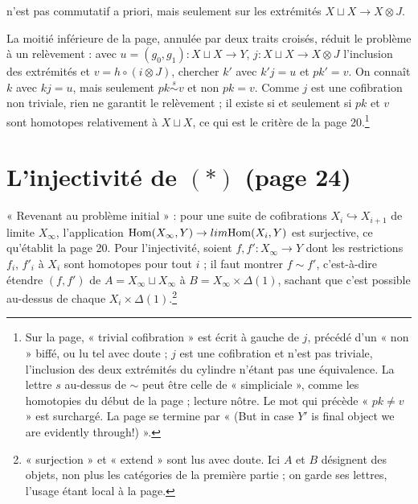 \documentclass[11pt,a4paper]{article}
\begin{document}

n'est pas commutatif a priori, mais seulement sur les extrémités $X \sqcup X
\to X \otimes J$.

La moitié inférieure de la page, annulée par deux traits croisés, réduit le
problème à un relèvement : avec $u = (g_{0}, g_{1}) : X \sqcup X \to Y$, $j : X
\sqcup X \to X \otimes J$ l'inclusion des extrémités et $v = h \circ (i
\otimes J)$, chercher $k'$ avec $k' j = u$ et $p k' = v$. On connaît $k$ avec
$k j = u$, mais seulement $p k \overset{s}{\sim} v$ et non $p k = v$. Comme $j$
est une cofibration non triviale, rien ne garantit le relèvement ; il existe
si et seulement si $p k$ et $v$ sont homotopes relativement à $X \sqcup X$, ce
qui est le critère de la page 20.\footnote{Sur la page, « trivial cofibration »
est écrit à gauche de $j$, précédé d'un « non » biffé, ou lu tel avec doute ;
$j$ est une cofibration et n'est pas triviale, l'inclusion des deux extrémités
du cylindre n'étant pas une équivalence. La lettre $s$ au-dessus de $\sim$
peut être celle de « simpliciale », comme les homotopies du début de la page ;
lecture nôtre. Le mot qui précède « $pk \neq v$ » est surchargé. La page se
termine par « (But in case $Y'$ is final object we are evidently
through!) ».}

\section*{L'injectivité de $(*)$ (page 24)}

« Revenant au problème initial » : pour une suite de cofibrations $X_{i}
\hookrightarrow X_{i+1}$ de limite $X_{\infty}$, l'application
$\mathrm{Hom}(X_{\infty}, Y) \to \varprojlim \mathrm{Hom}(X_{i}, Y)$ est
surjective, ce qu'établit la page 20. Pour l'injectivité, soient $f, f' :
X_{\infty} \to Y$ dont les restrictions $f_{i}$, $f'_{i}$ à $X_{i}$ sont
homotopes pour tout $i$ ; il faut montrer $f \sim f'$, c'est-à-dire étendre
$(f, f')$ de $A = X_{\infty} \sqcup X_{\infty}$ à $B = X_{\infty} \times
\Delta(1)$, sachant que c'est possible au-dessus de chaque $X_{i} \times
\Delta(1)$.\footnote{« surjection » et « extend » sont lus avec doute. Ici
$A$ et $B$ désignent des objets, non plus les catégories de la première
partie ; on garde ses lettres, l'usage étant local à la page.}
\end{document}
